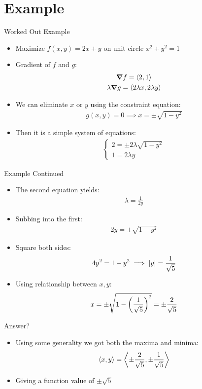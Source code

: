 \documentclass{beamer}
\begin{document}
\section{Example}
\begin{frame}{Worked Out Example}
  \begin{itemize}
  \item Maximize $f(x,y)=2x+y$ on unit circle $x^2+y^2=1$
  \item Gradient of $f$ and $g$:
    \begin{gather*}
      \grad{f}=\ev{2,1}\\
      \lambda\grad{g}=\ev{2\lambda x,2\lambda y}
    \end{gather*}
  \item We can eliminate $x$ or $y$ using the constraint equation:
    \begin{align*}
      g(x,y)=0\implies x=\pm\sqrt{1-y^2}
    \end{align*}
  \item Then it is a simple system of equations:
    \begin{align*}
      \begin{cases}
        2=\pm2\lambda\sqrt{1-y^2}\\
        1=2\lambda y
      \end{cases}
    \end{align*}
  \end{itemize}
\end{frame}
\begin{frame}{Example Continued}
  \begin{itemize}
  \item The second equation yields:
    \begin{align*}
      \lambda=\frac1{2y}
    \end{align*}
  \item Subbing into the first:
    \begin{align*}
      2y=\pm\sqrt{1-y^2}
    \end{align*}
  \item Square both sides:
    \begin{align*}
      4y^2=1-y^2\implies \abs{y}=\frac1{\sqrt{5}}
    \end{align*}
  \item Using relationship between $x,y$:
    \begin{align*}
      x=\pm\sqrt{1-\qty(\frac1{\sqrt{5}})^2}=\pm\frac{2}{\sqrt{5}}
    \end{align*}
  \end{itemize}
\end{frame}
\begin{frame}{Answer?}
  \begin{itemize}
  \item Using some generality we got both the maxima and minima:
    \begin{align*}
      \ev{x,y}=\ev{\pm\frac2{\sqrt{5}},\pm\frac1{\sqrt{5}}}
    \end{align*}
  \item Giving a function value of $\pm\sqrt{5}$
  \end{itemize}
\end{frame}
\end{document}
